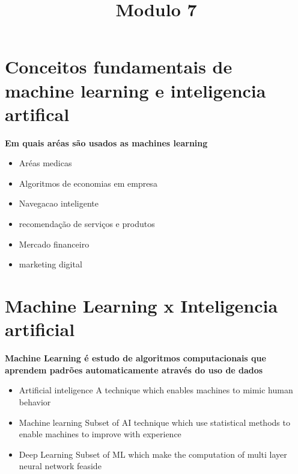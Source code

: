 \documentclass{article}
\date{} %
\title{Modulo 7}
\begin{document}
\maketitle
\tableofcontents
\newpage

\section{Conceitos fundamentais de machine learning e inteligencia artifical}
\textbf{Em quais aréas são usados as machines learning}
\begin{itemize}
    \item Aréas medicas
    \item Algoritmos de economias em empresa
    \item Navegacao inteligente
    \item recomendação de serviços e produtos
    \item Mercado financeiro
    \item marketing digital
\end{itemize}

\section{Machine Learning x Inteligencia artificial}
\textbf{Machine Learning é estudo de algoritmos computacionais que aprendem padrões automaticamente  através do uso de dados}

\begin{itemize}
    \item Artificial inteligence  A technique which enables machines to mimic human behavior
    \item Machine learning Subset of AI technique which use statistical methods to enable machines to improve with experience
    \item Deep Learning Subset of ML which make the computation of multi layer neural network feaside
\end{itemize}
\end{document}
